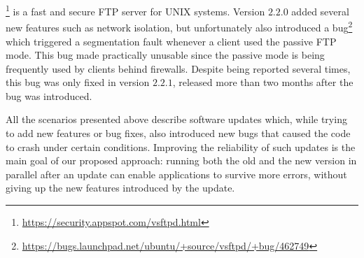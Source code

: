 \vsftpd\footnote{\url{https://security.appspot.com/vsftpd.html}} is a fast and 
secure FTP server for UNIX systems.  Version $2.2.0$ added several new
features such as network isolation, but unfortunately also introduced
a
bug\footnote{\url{https://bugs.launchpad.net/ubuntu/+source/vsftpd/+bug/462749}}
which triggered a segmentation fault whenever a client used the
passive FTP mode.  This bug made \vsftpd practically unusable since
the passive mode is being frequently used by clients behind firewalls.
Despite being reported several times, this bug was only fixed in
version $2.2.1$, released more than two months after the bug was
introduced.


All the scenarios presented above describe software updates which,
while trying to add new features or bug fixes, also introduced new
bugs that caused the code to crash under certain conditions.
Improving the reliability of such updates is the main goal of our
proposed approach: running both the old and the new version in
parallel after an update can enable applications to survive more
errors, without giving up the new features introduced by the update.

%

%

%


  

